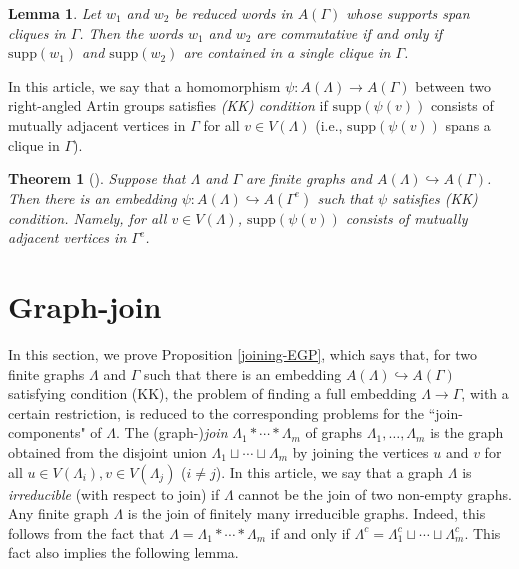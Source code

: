 \documentclass{amsart}
\theoremstyle{definition}
\theoremstyle{plain}
\newtheorem{theorem}[definition]{Theorem}
\newtheorem{lemma}[definition]{Lemma}
\numberwithin{equation}{section}
\begin{document}
\begin{lemma}
Let $w_1$ and $w_2$ be reduced words in $A(\Gamma)$ whose supports span cliques in $\Gamma$. 
Then the words $w_1$ and $w_2$ are commutative if and only if $\mathrm{supp}(w_1)$ and $\mathrm{supp}(w_2)$ are contained in a single clique in $\Gamma$. 
\label{commutative}
\end{lemma}

In this article, we say that a homomorphism $\psi \colon A(\Lambda) \rightarrow A(\Gamma)$ between two right-angled Artin groups satisfies {\it (KK) condition}  if $\mathrm{supp}(\psi(v))$ consists of mutually adjacent vertices in $\Gamma$ for all $v \in V(\Lambda)$ (i.e., $\mathrm{supp}(\psi(v))$ spans a clique in $\Gamma$). 

\begin{theorem}[{\cite[Theorem 4.3]{Kim--Koberda13}}]
Suppose that $\Lambda$ and $\Gamma$ are finite graphs and $A(\Lambda) \hookrightarrow A(\Gamma)$. 
Then there is an embedding $\psi \colon A(\Lambda) \hookrightarrow A(\Gamma^e)$ such that $\psi$ satisfies (KK) condition. 
Namely, for all $v \in V(\Lambda)$, $\mathrm{supp}(\psi(v))$ consists of mutually adjacent vertices in $\Gamma^e$. 
\label{Kim--Koberda}
\end{theorem}



\section{Graph-join \label{graph-join-sec}}
In this section, we prove Proposition \ref{joining-EGP}, which says that, for two finite graphs $\Lambda$ and $\Gamma$ such that there is an embedding $A(\Lambda) \hookrightarrow A(\Gamma)$ satisfying condition (KK), the problem of finding a full embedding $\Lambda \rightarrow \Gamma$, with a certain restriction, is reduced to the corresponding problems for the ``join-components" of $\Lambda$. 
The (graph-){\it join} $\Lambda_1 * \cdots *\Lambda_m$ of graphs $\Lambda_1, \ldots, \Lambda_m$ is the graph obtained from the disjoint union $\Lambda_1 \sqcup \cdots \sqcup \Lambda_m$ by joining the vertices $u$ and $v$ for all $u \in V(\Lambda_i), v \in V(\Lambda_j)$ ($i\neq j$).   
In this article, we say that a graph $\Lambda$ is {\it irreducible} (with respect to join) if $\Lambda$ cannot be the join of two non-empty graphs. 
Any finite graph $\Lambda$ is the join of finitely many irreducible graphs. 
Indeed, this follows from the fact that $\Lambda = \Lambda_1 * \cdots * \Lambda_m$ if and only if $\Lambda^c = \Lambda_1^c \sqcup \cdots \sqcup \Lambda_m^c$. 
This fact also implies the following lemma. 
\end{document}
